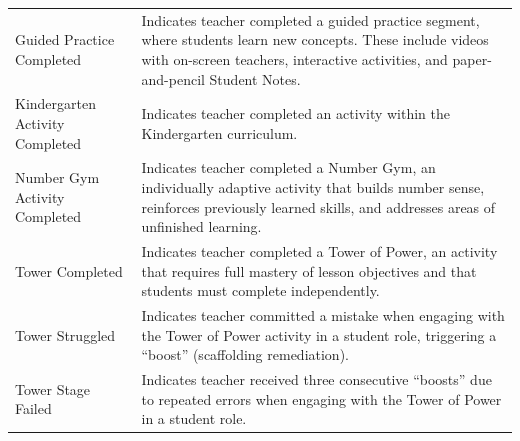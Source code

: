 \documentclass[
  number,
  preprint,
  3p,
  onecolumn]{elsarticle}
\begin{document}
\begin{longtable}[]{@{}
  >{\raggedright\arraybackslash}p{}
  >{\raggedright\arraybackslash}p{}@{}}
Guided Practice Completed \citep{zearn2024r} & Indicates teacher
completed a guided practice segment, where students learn new concepts.
These include videos with on-screen teachers, interactive activities,
and paper-and-pencil Student Notes. \\
Kindergarten Activity Completed \citep{zearn2024s} & Indicates teacher
completed an activity within the Kindergarten curriculum. \\
Number Gym Activity Completed \citep{zearn2024t} & Indicates teacher
completed a Number Gym, an individually adaptive activity that builds
number sense, reinforces previously learned skills, and addresses areas
of unfinished learning. \\
Tower Completed \citep{zearn2024b} & Indicates teacher completed a Tower
of Power, an activity that requires full mastery of lesson objectives
and that students must complete independently. \\
Tower Struggled \citep{zearn2024u} & Indicates teacher committed a
mistake when engaging with the Tower of Power activity in a student
role, triggering a ``boost'' (scaffolding remediation). \\
Tower Stage Failed \citep{zearn2024b} & Indicates teacher received three
consecutive ``boosts'' due to repeated errors when engaging with the
Tower of Power in a student role. \\
\end{longtable}

\newpage{}
\end{document}
